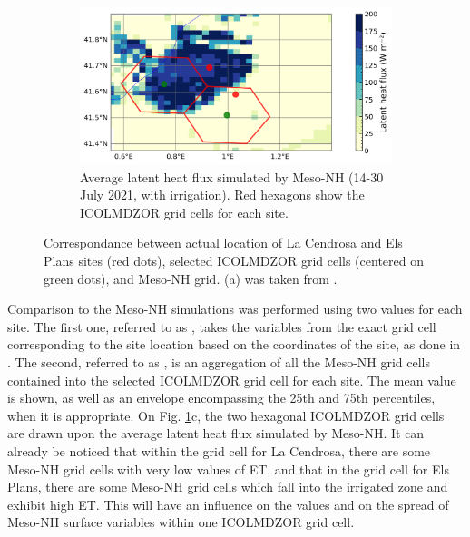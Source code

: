 \begin{figure}[hbtp]
    \begin{subfigure}[t]{0.75\textwidth}
            \caption{Average latent heat flux simulated by Meso-NH (14-30 July 2021, with irrigation). Red hexagons show the ICOLMDZOR grid cells for each site.}
            \includegraphics[width=\textwidth]{images/chap6/liaise_sites_mean_mesoNH.png}
        \end{subfigure} 
    
    \caption{Correspondance between actual location of La Cendrosa and Els Plans sites (red dots), selected ICOLMDZOR grid cells (centered on green dots), and Meso-NH grid. (a) was taken from \citet{lunel_irrigation_2024}.}
    \label{fig:liaise_sites_grid_cells}
\end{figure}

Comparison to the Meso-NH simulations was performed using two values for each site. 
The first one, referred to as \mesoexact, takes the variables from the exact grid cell corresponding to the site location based on the coordinates of the site, as done in \citet{lunel_irrigation_2024}. 
The second, referred to as \mesomean, is an aggregation of all the Meso-NH grid cells contained into the selected ICOLMDZOR grid cell for each site. The mean value is shown, as well as an envelope encompassing the 25th and 75th percentiles, when it is appropriate.
On Fig. \ref{fig:liaise_sites_grid_cells}c, the two hexagonal ICOLMDZOR grid cells are drawn upon the average latent heat flux simulated by Meso-NH. It can already be noticed that within the grid cell for La Cendrosa, there are some Meso-NH grid cells with very low values of ET, and that in the grid cell for Els Plans, there are some Meso-NH grid cells which fall into the irrigated zone and exhibit high ET. This will have an influence on the \mesomean values and on the spread of Meso-NH surface variables within one ICOLMDZOR grid cell. 

